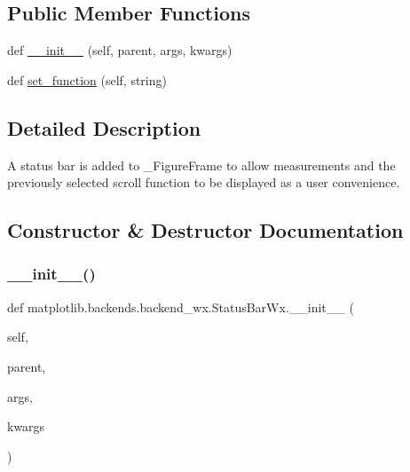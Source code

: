 \subsection*{Public Member Functions}
\begin{DoxyCompactItemize}
\item 
def \hyperlink{classmatplotlib_1_1backends_1_1backend__wx_1_1StatusBarWx_ab7c8bdae06968657c74b6c41526bfde5}{\+\_\+\+\_\+init\+\_\+\+\_\+} (self, parent, args, kwargs)
\item 
def \hyperlink{classmatplotlib_1_1backends_1_1backend__wx_1_1StatusBarWx_aec8b3bd0a19ff85bfe65fa1b735eff89}{set\+\_\+function} (self, string)
\end{DoxyCompactItemize}


\subsection{Detailed Description}
\begin{DoxyVerb}A status bar is added to _FigureFrame to allow measurements and the
previously selected scroll function to be displayed as a user convenience.
\end{DoxyVerb}
 

\subsection{Constructor \& Destructor Documentation}
\mbox{\label{classmatplotlib_1_1backends_1_1backend__wx_1_1StatusBarWx_ab7c8bdae06968657c74b6c41526bfde5}} 
\subsubsection{\texorpdfstring{\+\_\+\+\_\+init\+\_\+\+\_\+()}{\_\_init\_\_()}}
{\footnotesize\ttfamily def matplotlib.\+backends.\+backend\+\_\+wx.\+Status\+Bar\+Wx.\+\_\+\+\_\+init\+\_\+\+\_\+ (\begin{DoxyParamCaption}\item[{}]{self,  }\item[{}]{parent,  }\item[{}]{args,  }\item[{}]{kwargs }\end{DoxyParamCaption})}



